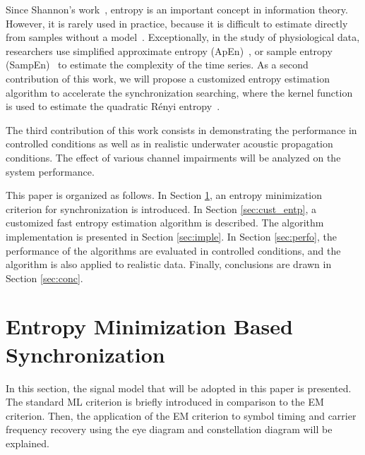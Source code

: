 \documentclass[journal,comsoc,onecolumn, 12pt,draftclsnofoot]{IEEEtran}
\begin{document}
Since Shannon's work~\cite{Shannon1948}, entropy is an important concept in information theory. 
However, it is rarely used in practice, because it is difficult to estimate directly from samples without a model~\cite{Bercher2000,Santamaria2002}.
Exceptionally, in the study of physiological data, researchers use simplified approximate entropy (ApEn)~\cite{Pincus1991}, or sample entropy (SampEn)~\cite{Richman2000} to estimate the complexity of the time series.
As a second contribution of this work, we will propose a customized entropy estimation algorithm to accelerate the synchronization searching,
where the kernel function is used to estimate the quadratic R\'enyi entropy~\cite{Santamaria2002,Huang2008}.

The third contribution of this work consists in demonstrating the performance in controlled conditions as well as in realistic underwater acoustic propagation conditions.  
The effect of various channel impairments will be analyzed on the system performance.  



This paper is organized as follows.
In Section \ref{sec:entropy},
an entropy minimization criterion for synchronization is introduced. 
In Section \ref{sec:cust_entp}, a customized fast entropy estimation algorithm is described. 
The algorithm implementation is presented in Section \ref{sec:imple}.
In Section \ref{sec:perfo}, the performance of the algorithms are evaluated in controlled conditions, and the algorithm is also applied to realistic data.  
Finally, conclusions are drawn in Section \ref{sec:conc}.

\section{Entropy Minimization Based Synchronization}
\label{sec:entropy}
In this section, the signal model that will be adopted in this paper is presented.
The standard ML criterion is briefly introduced in comparison to the EM criterion.
Then, the application of the EM criterion to symbol timing and carrier frequency recovery using the eye diagram and constellation diagram will be explained.
\end{document}
